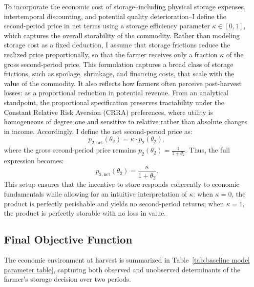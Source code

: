 To incorporate the economic cost of storage--including physical storage expenses, intertemporal discounting, and potential quality deterioration--I define the second-period price in net terms using a storage efficiency parameter $\kappa \in [0,1]$, which captures the overall storability of the commodity. Rather than modeling storage cost as a fixed deduction, I assume that storage frictions reduce the realized price proportionally, so that the farmer receives only a fraction $\kappa$ of the gross second-period price. This formulation captures a broad class of storage frictions, such as spoilage, shrinkage, and financing costs, that scale with the value of the commodity. It also reflects how farmers often perceive post-harvest losses: as a proportional reduction in potential revenue. From an analytical standpoint, the proportional specification preserves tractability under the Constant Relative Risk Aversion (CRRA) preferences, where utility is homogeneous of degree one and sensitive to relative rather than absolute changes in income. Accordingly, I define the net second-period price as:
$$
p_{2,\text{net}}(\theta_2) = \kappa \cdot p_2(\theta_2),
$$
where the gross second-period price remains $p_2(\theta_2) = \frac{1}{1 + \theta_2}$. Thus, the full expression becomes:
$$
p_{2,\text{net}}(\theta_2) = \frac{\kappa}{1 + \theta_2}.
$$
This setup ensures that the incentive to store responds coherently to economic fundamentals while allowing for an intuitive interpretation of $\kappa$: when $\kappa = 0$, the product is perfectly perishable and yields no second-period returns; when $\kappa = 1$, the product is perfectly storable with no loss in value.






\subsection{Final Objective Function}

\noindent The economic environment at harvest is summarized in Table~\ref{tab:baseline model parameter table}, capturing both observed and unobserved determinants of the farmer's storage decision over two periods.

